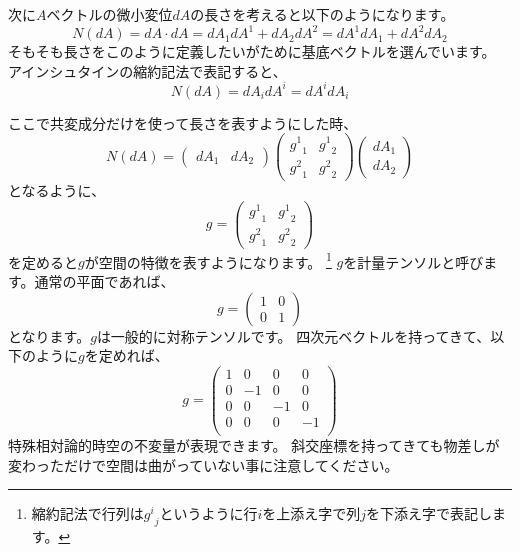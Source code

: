 \documentclass[a4paper,12pt,notitlepage]{jsreport}
\begin{document}
次に$A$ベクトルの微小変位$dA$の長さを考えると以下のようになります。
\begin{equation}
  N(dA)=dA\cdot dA=dA_1dA^1+dA_2dA^2=dA^1dA_1+dA^2dA_2
\end{equation}
そもそも長さをこのように定義したいがために基底ベクトルを選んでいます。
アインシュタインの縮約記法で表記すると、
\begin{equation}
  N(dA)=dA_idA^i=dA^idA_i
\end{equation}

ここで共変成分だけを使って長さを表すようにした時、
\begin{equation}
  N(dA)=
  \begin{pmatrix}
    dA_1&dA_2
  \end{pmatrix}
  \begin{pmatrix}
    {g^1}_1&{g^1}_2\\{g^2}_1&{g^2}_2
  \end{pmatrix}
  \begin{pmatrix}
    dA_1\\dA_2
  \end{pmatrix}
\end{equation}
となるように、
\begin{equation}
  g=
  \begin{pmatrix}
    {g^1}_1&{g^1}_2\\{g^2}_1&{g^2}_2
  \end{pmatrix}
\end{equation}
を定めると$g$が空間の特徴を表すようになります。
\footnote{縮約記法で行列は${g^i}_j$というように行$i$を上添え字で列$j$を下添え字で表記します。}
$g$を計量テンソルと呼びます。通常の平面であれば、
\begin{equation}
  g=
  \begin{pmatrix}
    1&0\\0&1
  \end{pmatrix}
\end{equation}
となります。$g$は一般的に対称テンソルです。
四次元ベクトルを持ってきて、以下のように$g$を定めれば、
\begin{equation}
  g=
  \begin{pmatrix}
    1&0&0&0\\
    0&-1&0&0\\
    0&0&-1&0\\
    0&0&0&-1\\
  \end{pmatrix}
\end{equation}
特殊相対論的時空の不変量が表現できます。
斜交座標を持ってきても物差しが変わっただけで空間は曲がっていない事に注意してください。
\end{document}
